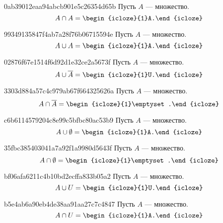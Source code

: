\begin{note}{0ab39012eaa94abcb901e5c26354d65b}
    Пусть \({ A }\) --- множество.
    \[
        A \cap A = \begin{icloze}{1}A.\end{icloze}
    \]
\end{note}

\begin{note}{99349135847f4ab7a28f76b06715594e}
    Пусть \({ A }\) --- множество.
    \[
        A \cup A = \begin{icloze}{1}A.\end{icloze}
    \]
\end{note}

\begin{note}{02876f67e1514f6d92d1e32ce2a5673f}
    Пусть \({ A }\) --- множество.
    \[
        A \cup \overline{A} = \begin{icloze}{1}U.\end{icloze}
    \]
\end{note}

\begin{note}{3303d884a57c4c979ab67f664325626a}
    Пусть \({ A }\) --- множество.
    \[
        A \cap \overline{A} = \begin{icloze}{1}\emptyset.\end{icloze}
    \]
\end{note}

\begin{note}{c6b6114579204c8e99c5bfbc80ac53b9}
    Пусть \({ A }\) --- множество.
    \[
        A \cup \emptyset = \begin{icloze}{1}A.\end{icloze}
    \]
\end{note}

\begin{note}{35fbc385403041a7a92f1a9980d5643f}
    Пусть \({ A }\) --- множество.
    \[
        A \cap \emptyset = \begin{icloze}{1}\emptyset.\end{icloze}
    \]
\end{note}

\begin{note}{bf06afa6211c4b10bd2ecffa833b05a2}
    Пусть \({ A }\) --- множество.
    \[
        A \cup U = \begin{icloze}{1}U.\end{icloze}
    \]
\end{note}

\begin{note}{b5e4ab6a90eb4de38aa91aa27c7c4847}
    Пусть \({ A }\) --- множество.
    \[
        A \cap U = \begin{icloze}{1}A.\end{icloze}
    \]
\end{note}

